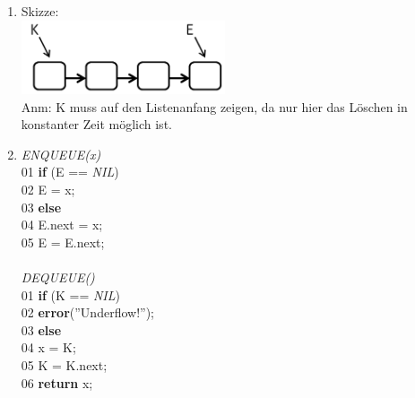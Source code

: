 \documentclass{scrartcl}
\begin{document}
\begin{enumerate}[(1)]
\item Skizze: \\
	\includegraphics[width=6cm]{images/QueueListe}\\
	Anm: K muss auf den Listenanfang zeigen, da nur hier das Löschen in konstanter Zeit möglich ist.
\item \textit{ENQUEUE(x)}\\
	01 \tab \textbf{if} (E == \textit{NIL})\\
	02 \tab \tab E = x;\\
	03 \tab \textbf{else\\}
	04 \tab \tab  E.next = x;\\
	05 \tab \tab E = E.next;\\
	\ \\
	\textit{DEQUEUE()}\\
	01 \tab \textbf{if} (K == \textit{NIL})\\
	02 \tab \tab \textbf{error}(''Underflow!'');\\
	03 \tab \textbf{else}\\
	04 \tab \tab x = K;\\
	05 \tab \tab K = K.next;\\
	06 \tab \tab \textbf{return} x;

\end{enumerate}
\end{document}
